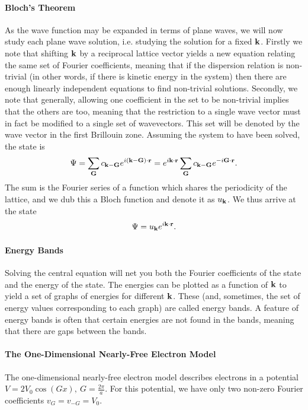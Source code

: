 \paragraph{Bloch's Theorem}
As the wave function may be expanded in terms of plane waves, we will now study each plane wave solution, i.e. studying the solution for a fixed $\vb{k}$. Firstly we note that shifting $\vb{k}$ by a reciprocal lattice vector yields a new equation relating the same set of Fourier coefficients, meaning that if the dispersion relation is non-trivial (in other words, if there is kinetic energy in the system) then there are enough linearly independent equations to find non-trivial solutions. Secondly, we note that generally, allowing one coefficient in the set to be non-trivial implies that the others are too, meaning that the restriction to a single wave vector must in fact be modified to a single set of wavevectors. This set will be denoted by the wave vector in the first Brillouin zone. Assuming the system to have been solved, the state is
\begin{align*}
	\Psi = \sum\limits_{\vb{G}}c_{\vb{k} - \vb{G}}e^{i(\vb{k} - \vb{G})\cdot\vb{r}} = e^{i\vb{k}\cdot\vb{r}}\sum\limits_{\vb{G}}c_{\vb{k} - \vb{G}}e^{-i\vb{G}\cdot\vb{r}}.
\end{align*}
The sum is the Fourier series of a function which shares the periodicity of the lattice, and we dub this a Bloch function and denote it as $u_{\vb{k}}$. We thus arrive at the state
\begin{align*}
	\Psi = u_{\vb{k}}e^{i\vb{k}\cdot\vb{r}}.
\end{align*}

\paragraph{Energy Bands}
Solving the central equation will net you both the Fourier coefficients of the state and the energy of the state. The energies can be plotted as a function of $\vb{k}$ to yield a set of graphs of energies for different $\vb{k}$. These (and, sometimes, the set of energy values corresponding to each graph) are called energy bands. A feature of energy bands is often that certain energies are not found in the bands, meaning that there are gaps between the bands.

\paragraph{The One-Dimensional Nearly-Free Electron Model}
The one-dimensional nearly-free electron model describes electrons in a potential $V = 2V_{0}\cos(Gx),\ G = \frac{2\pi}{a}$. For this potential, we have only two non-zero Fourier coefficients $v_{G} = v_{-G} = V_{0}$.

